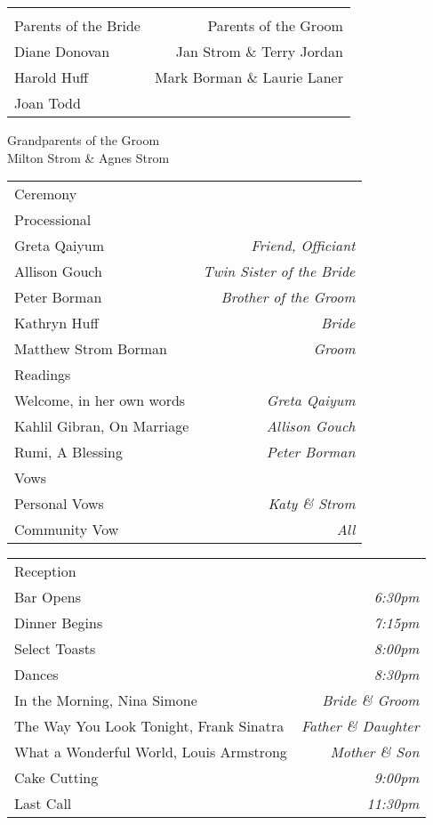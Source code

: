 \documentclass[11pt]{article}
\makeatletter
\newcommand*\ColText[1]{\textcolor{Goldenrod3}{#1}}
\newenvironment{Group}[1]
  {\noindent\begin{tabular*}{\textwidth}{@{}p{.7\textwidth}@{\extracolsep{\fill}}r@{}}
    {\fontsize{24}{29}\selectfont\ColText{#1}}\\[0.8em]}
  {\end{tabular*}}
\newcommand*\CenteredEntry[1]{%
  \sffamily #1}
\newcommand*\CenteredExpl[1]{%
  \footnotesize #1}
\newcommand*\LREntry[2]{%
  \sffamily #1 & \sffamily #2}
\newcommand*\LRExpl[2]{%
  \footnotesize #1 & \footnotesize #2}
\newcommand*\Entry[2]{%
  \sffamily #1 & \footnotesize\textit{#2}}
\newcommand*\Expl[2]{%
  \hspace*{1em}\footnotesize #1 & \footnotesize\textit{#2}}
\makeatother
\begin{document}
\begin{Group}{}
\LREntry{Parents of the Bride}{Parents of the Groom} \\
\LRExpl{Diane Donovan}{Jan Strom \& Terry Jordan} \\
\LRExpl{Harold Huff}{Mark Borman \& Laurie Laner} \\
\LRExpl{Joan Todd}{}
\end{Group}
\begin{center}
\CenteredEntry{Grandparents of the Groom} \\
\CenteredExpl{Milton Strom \& Agnes Strom}
\end{center}

\vfill

\begin{Group}{Ceremony}
\Entry{Processional}{}\\
\Expl{Greta Qaiyum}{Friend, Officiant}\\
\Expl{Allison Gouch}{Twin Sister of the Bride}\\
\Expl{Peter Borman}{Brother of the Groom}\\
\Expl{Kathryn Huff}{Bride}\\
\Expl{Matthew Strom Borman}{Groom}\\
\Entry{Readings}{} \\
\Expl{Welcome, in her own words}{Greta Qaiyum} \\
\Expl{Kahlil Gibran, On Marriage}{Allison Gouch} \\
\Expl{Rumi, A Blessing}{Peter Borman} \\
\Entry{Vows}{} \\
\Expl{Personal Vows}{Katy \& Strom}\\
\Expl{Community Vow}{All}\\
\end{Group}

\vfill

\begin{Group}{Reception}
\Entry{Bar Opens}{6:30pm} \\
\Entry{Dinner Begins}{7:15pm} \\
\Entry{Select Toasts}{8:00pm} \\
\Entry{Dances}{8:30pm} \\
\Expl{In the Morning, Nina Simone}{Bride \& Groom} \\
\Expl{The Way You Look Tonight, Frank Sinatra}{Father \& Daughter} \\
\Expl{What a Wonderful World, Louis Armstrong}{Mother \& Son} \\
\Entry{Cake Cutting}{9:00pm} \\
\Entry{Last Call}{11:30pm}
\end{Group}
\end{document}
